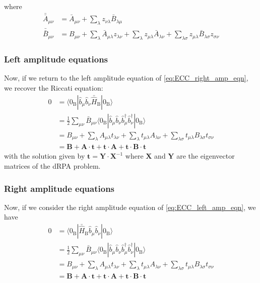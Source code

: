 where
\begin{subequations}
\begin{align}
	\bar{\bar{A}}_{\mu \nu} & 
	= \bar{A}_{\mu \nu} 
	+ \sum_{\lambda}  z_{\nu \lambda} \bar{B}_{\lambda \mu}
	\\
	\bar{\bar{B}}_{\mu \nu} & 
	= B_{\mu \nu} + \sum_{\lambda} \bar{A}_{\mu \lambda} z_{\lambda \nu} + \sum_\lambda z_{\mu \lambda} \bar{A}_{\lambda \nu} + \sum_{\lambda \sigma} z_{\mu \lambda } \bar{B}_{\lambda \sigma} z_{\sigma \nu}
\end{align}
\end{subequations}
\subsubsection{Left amplitude equations}
Now, if we return to the left amplitude equation of \ref{eq:ECC_right_amp_eqn}, we recover the Riccati equation:
\begin{align}
0 & = \langle0_{\mathrm{B}}| \hat{b}_{\mu} \hat{b}_{\nu} \bar{\hat{H}}_{\mathrm{B}} | 0_{\mathrm{B}} \rangle \\
& = \frac{1}{2} \sum_{\mu\nu} \bar{B}_{\mu \nu} \langle 0_{\mathrm{B}}| \hat{b}_{\mu} \hat{b}_{\nu} \hat{b}^\dagger_{\mu} \hat{b}^\dagger_{\nu} | 0_{\mathrm{B}} \rangle \\
 & = B_{\mu \nu} + \sum_{\lambda} A_{\mu \lambda} t_{\lambda \nu} + \sum_\lambda t_{\mu \lambda} A_{\lambda \nu} + \sum_{\lambda \sigma} t_{\mu \lambda } B_{\lambda \sigma} t_{\sigma \nu}\\
 & = \bm{B} + \mathbf{A}\cdot\mathbf{t} + \mathbf{t}\cdot\mathbf{A} + \mathbf{t}\cdot\mathbf{B}\cdot\mathbf{t}
\end{align}
with the solution given by $\mathbf{t} = \mathbf{Y}\cdot\mathbf{X}^{-1}$ where $\mathbf{X}$ and $\mathbf{Y}$ are the eigenvector matrices of the dRPA problem.
\subsubsection{Right amplitude equations}
Now, if we consider the right amplitude equation of \ref{eq:ECC_left_amp_eqn}, we have
\begin{align}
0 & = \langle0_{\mathrm{B}}| \bar{\hat{H}}_{\mathrm{B}} \hat{b}_{\mu} \hat{b}_{\nu} | 0_{\mathrm{B}} \rangle \\
& = \frac{1}{2} \sum_{\mu\nu} \bar{B}_{\mu \nu} \langle 0_{\mathrm{B}}| \hat{b}_{\mu} \hat{b}_{\nu} \hat{b}^\dagger_{\mu} \hat{b}^\dagger_{\nu} | 0_{\mathrm{B}} \rangle \\
 & = B_{\mu \nu} + \sum_{\lambda} A_{\mu \lambda} t_{\lambda \nu} + \sum_\lambda t_{\mu \lambda} A_{\lambda \nu} + \sum_{\lambda \sigma} t_{\mu \lambda } B_{\lambda \sigma} t_{\sigma \nu}\\
 & = \bm{B} + \mathbf{A}\cdot\mathbf{t} + \mathbf{t}\cdot\mathbf{A} + \mathbf{t}\cdot\mathbf{B}\cdot\mathbf{t}
\end{align}


